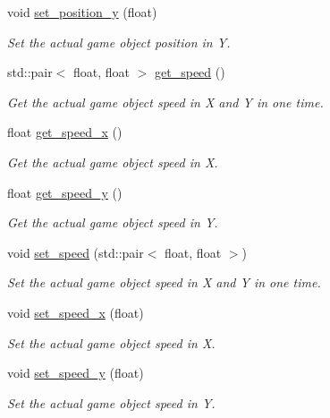 \begin{DoxyCompactItemize}
void \hyperlink{classengine_1_1_game_object_af11340a490fa5df068c73dbd4b788b9c}{set\+\_\+position\+\_\+y} (float)
\begin{DoxyCompactList}\small\item\em Set the actual game object position in Y. \end{DoxyCompactList}\item 
std\+::pair$<$ float, float $>$ \hyperlink{classengine_1_1_game_object_a62df587f097d4d7890a24687cc7ae2ab}{get\+\_\+speed} ()
\begin{DoxyCompactList}\small\item\em Get the actual game object speed in X and Y in one time. \end{DoxyCompactList}\item 
float \hyperlink{classengine_1_1_game_object_a3efe26ba32b16b65ec2b46e0bc6f8bbc}{get\+\_\+speed\+\_\+x} ()
\begin{DoxyCompactList}\small\item\em Get the actual game object speed in X. \end{DoxyCompactList}\item 
float \hyperlink{classengine_1_1_game_object_abaacf952522ecc92a47498eca2bac437}{get\+\_\+speed\+\_\+y} ()
\begin{DoxyCompactList}\small\item\em Get the actual game object speed in Y. \end{DoxyCompactList}\item 
void \hyperlink{classengine_1_1_game_object_a2485b78a86a188c489382180ae8c0f84}{set\+\_\+speed} (std\+::pair$<$ float, float $>$)
\begin{DoxyCompactList}\small\item\em Set the actual game object speed in X and Y in one time. \end{DoxyCompactList}\item 
void \hyperlink{classengine_1_1_game_object_acec07e80e5a5b83185a2c84d74393bfd}{set\+\_\+speed\+\_\+x} (float)
\begin{DoxyCompactList}\small\item\em Set the actual game object speed in X. \end{DoxyCompactList}\item 
void \hyperlink{classengine_1_1_game_object_a62ba05459de448237e6de79eb9cb1557}{set\+\_\+speed\+\_\+y} (float)
\begin{DoxyCompactList}\small\item\em Set the actual game object speed in Y. \end{DoxyCompactList}\item 

\end{DoxyCompactItemize}
